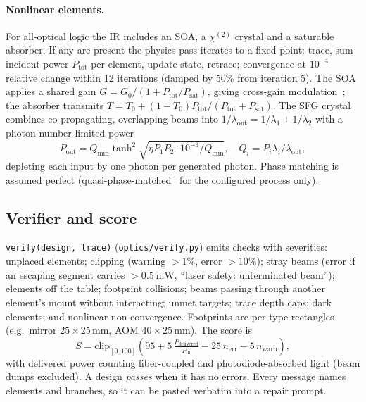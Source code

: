 \documentclass[10pt,twocolumn,letterpaper]{article}
\newcommand{\code}[1]{\texttt{\small #1}}
\begin{document}
\paragraph{Nonlinear elements.} For all-optical logic the IR includes an SOA, a $\chi^{(2)}$ crystal and a saturable absorber. If any are present the physics pass iterates to a fixed point: trace, sum incident power $P_{\mathrm{tot}}$ per element, update state, retrace; convergence at $10^{-4}$ relative change within 12 iterations (damped by 50\% from iteration 5). The SOA applies a shared gain $G=G_0/(1+P_{\mathrm{tot}}/P_{\mathrm{sat}})$, giving cross-gain modulation~\cite{stubkjaer2000}; the absorber transmits $T=T_0+(1-T_0)P_{\mathrm{tot}}/(P_{\mathrm{tot}}+P_{\mathrm{sat}})$. The SFG crystal combines co-propagating, overlapping beams into $1/\lambda_{\mathrm{out}}=1/\lambda_1+1/\lambda_2$ with a photon-number-limited power
\begin{equation}
P_{\mathrm{out}} = Q_{\min}\tanh^2\!\sqrt{\eta P_1P_2\cdot 10^{-3}/Q_{\min}},\quad Q_i=P_i\lambda_i/\lambda_{\mathrm{out}},
\end{equation}
depleting each input by one photon per generated photon. Phase matching is assumed perfect (quasi-phase-matched~\cite{pplnqpm} for the configured process only).

\subsection{Verifier and score}
\label{sec:verify}
\code{verify(design, trace)} (\code{optics/verify.py}) emits checks with severities: unplaced elements; clipping (warning $>1\%$, error $>10\%$); stray beams (error if an escaping segment carries $>\SI{0.5}{\milli\watt}$, ``laser safety: unterminated beam''); elements off the table; footprint collisions; beams passing through another element's mount without interacting; unmet targets; trace depth caps; dark elements; and nonlinear non-convergence. Footprints are per-type rectangles (e.g.\ mirror $25\times25$\,mm, AOM $40\times25$\,mm). The score is
\begin{equation}
S = \mathrm{clip}_{[0,100]}\!\left(95 + 5\,\tfrac{P_{\mathrm{delivered}}}{P_{\mathrm{in}}} - 25\,n_{\mathrm{err}} - 5\,n_{\mathrm{warn}}\right),
\end{equation}
with delivered power counting fiber-coupled and photodiode-absorbed light (beam dumps excluded). A design \emph{passes} when it has no errors. Every message names elements and branches, so it can be pasted verbatim into a repair prompt.
\end{document}
